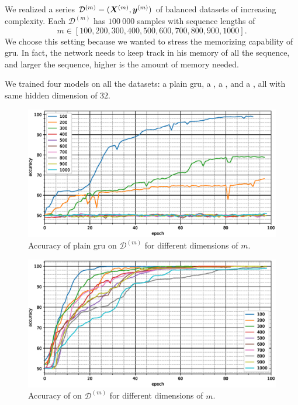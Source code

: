 We realized a series
$\mathcal{D}^{(m)}=(\bm{X}^{(m)},\bm{y}^{(m)})$ of balanced
datasets of increasing complexity. Each $\mathcal{D}^{(m)}$ has $100\ 000$
samples with 
sequence lengths of
$$
m\in[100,200,300,400,500,600,700,800,900,1000].$$
We choose this setting because we wanted to stress the memorizing
capability of \ac{gru}. In fact, the network needs to keep track in
his memory of
all the sequence, and larger the sequence, higher is the amount of
memory needed.

We trained four models on
all the datasets: a plain \ac{gru}, a
\maxp{}, a \softmax{}, and a \maxi{}, all with same hidden dimension of $32$. 

\begin{figure}
  \centering
  \includegraphics[width=\floatwidth]{imgMax/accuracy-base.eps}
  \caption{Accuracy of plain \ac{gru} on $\mathcal{D}^{(m)}$ for different dimensions of $m$.}
  \label{fig:testAccBase}
\end{figure}

\begin{figure}
  \centering
  \includegraphics[width=\floatwidth]{imgMax/accuracy-max.eps}
  \caption{Accuracy of \maxi{} on $\mathcal{D}^{(m)}$ for different dimensions of $m$.}
  \label{fig:testAccMax}
\end{figure}

